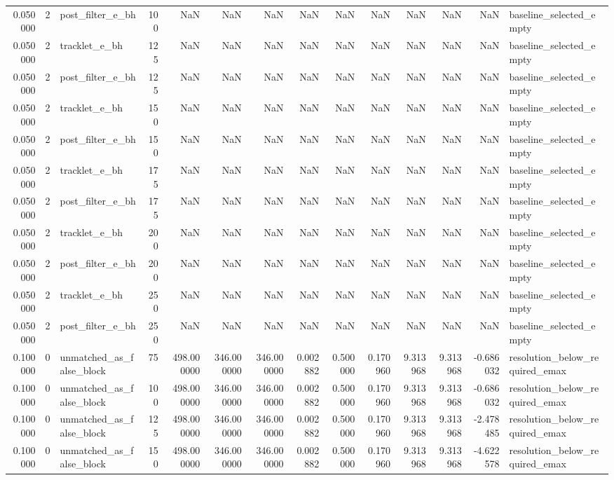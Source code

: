\begin{tabular}{rrlrrrrrrrrrrl}
0.050000 & 2 & post_filter_e_bh & 100 & NaN & NaN & NaN & NaN & NaN & NaN & NaN & NaN & NaN & baseline_selected_empty \\
0.050000 & 2 & tracklet_e_bh & 125 & NaN & NaN & NaN & NaN & NaN & NaN & NaN & NaN & NaN & baseline_selected_empty \\
0.050000 & 2 & post_filter_e_bh & 125 & NaN & NaN & NaN & NaN & NaN & NaN & NaN & NaN & NaN & baseline_selected_empty \\
0.050000 & 2 & tracklet_e_bh & 150 & NaN & NaN & NaN & NaN & NaN & NaN & NaN & NaN & NaN & baseline_selected_empty \\
0.050000 & 2 & post_filter_e_bh & 150 & NaN & NaN & NaN & NaN & NaN & NaN & NaN & NaN & NaN & baseline_selected_empty \\
0.050000 & 2 & tracklet_e_bh & 175 & NaN & NaN & NaN & NaN & NaN & NaN & NaN & NaN & NaN & baseline_selected_empty \\
0.050000 & 2 & post_filter_e_bh & 175 & NaN & NaN & NaN & NaN & NaN & NaN & NaN & NaN & NaN & baseline_selected_empty \\
0.050000 & 2 & tracklet_e_bh & 200 & NaN & NaN & NaN & NaN & NaN & NaN & NaN & NaN & NaN & baseline_selected_empty \\
0.050000 & 2 & post_filter_e_bh & 200 & NaN & NaN & NaN & NaN & NaN & NaN & NaN & NaN & NaN & baseline_selected_empty \\
0.050000 & 2 & tracklet_e_bh & 250 & NaN & NaN & NaN & NaN & NaN & NaN & NaN & NaN & NaN & baseline_selected_empty \\
0.050000 & 2 & post_filter_e_bh & 250 & NaN & NaN & NaN & NaN & NaN & NaN & NaN & NaN & NaN & baseline_selected_empty \\
0.100000 & 0 & unmatched_as_false_block & 75 & 498.000000 & 346.000000 & 346.000000 & 0.002882 & 0.500000 & 0.170960 & 9.313968 & 9.313968 & -0.686032 & resolution_below_required_emax \\
0.100000 & 0 & unmatched_as_false_block & 100 & 498.000000 & 346.000000 & 346.000000 & 0.002882 & 0.500000 & 0.170960 & 9.313968 & 9.313968 & -0.686032 & resolution_below_required_emax \\
0.100000 & 0 & unmatched_as_false_block & 125 & 498.000000 & 346.000000 & 346.000000 & 0.002882 & 0.500000 & 0.170960 & 9.313968 & 9.313968 & -2.478485 & resolution_below_required_emax \\
0.100000 & 0 & unmatched_as_false_block & 150 & 498.000000 & 346.000000 & 346.000000 & 0.002882 & 0.500000 & 0.170960 & 9.313968 & 9.313968 & -4.622578 & resolution_below_required_emax \\

\end{tabular}
